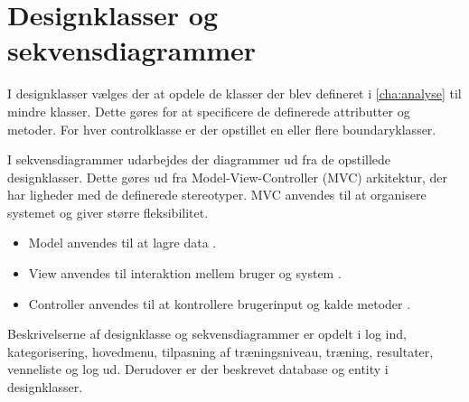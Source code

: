 \section{Designklasser og sekvensdiagrammer}
I designklasser vælges der at opdele de klasser der blev defineret i \autoref{cha:analyse} til mindre klasser. Dette gøres for at specificere de definerede attributter og metoder. For hver controlklasse er der opstillet en eller flere boundaryklasser. 

I sekvensdiagrammer udarbejdes der diagrammer ud fra de opstillede designklasser. Dette gøres ud fra Model-View-Controller (MVC) arkitektur, der har ligheder med de definerede stereotyper. MVC anvendes til at organisere systemet og giver større fleksibilitet. 

\begin{itemize}
\item Model anvendes til at lagre data \cite{Brahma2015}.
\item View anvendes til interaktion mellem bruger og system \cite{Brahma2015}.
\item Controller anvendes til at kontrollere brugerinput og kalde metoder \cite{Brahma2015}.
\end{itemize}

\noindent
Beskrivelserne af designklasse og sekvensdiagrammer er opdelt i log ind, kategorisering, hovedmenu, tilpasning af træningsniveau, træning, resultater, venneliste og log ud. Derudover er der beskrevet database og entity i designklasser. 
